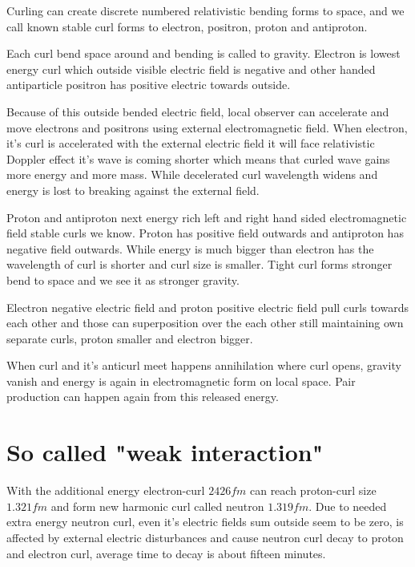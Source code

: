 Curling can create discrete numbered relativistic bending forms to space, and
we call known stable curl forms to electron, positron, proton and antiproton.

Each curl bend space around and bending is called to gravity. Electron is
lowest energy curl which outside visible electric field is negative and other
handed antiparticle positron has positive electric towards outside.

Because of this outside bended electric field, local observer can accelerate
and move electrons and positrons using external electromagnetic field. When
electron, it's curl is accelerated with the external electric field it will
face relativistic Doppler effect it's wave is coming shorter which means that
curled wave gains more energy and more mass. While decelerated curl wavelength
widens and energy is lost to breaking against the external field.

Proton and antiproton next energy rich left and right hand sided electromagnetic
field stable curls we know. Proton has positive field outwards and antiproton
has negative field outwards. While energy is much bigger than electron has the
wavelength of curl is shorter and curl size is smaller. Tight curl forms
stronger bend to space and we see it as stronger gravity.

Electron negative electric field and proton positive electric field pull curls
towards each other and those can superposition over the each other still
maintaining own separate curls, proton smaller and electron bigger.

When curl and it's anticurl meet happens annihilation\cite{Annihilation} where
curl opens, gravity vanish and energy is again in electromagnetic form on local
space. Pair production\cite{PairProduction} can happen again from this released
energy.

\section{So called "weak interaction"}
\label{weak_interaction}

With the additional energy electron-curl $2426fm$\cite{ComptonWavelength}
can reach proton-curl size $1.321fm$ and form new harmonic curl called neutron
$1.319fm$. Due to needed extra energy neutron curl, even it's electric fields
sum outside seem to be zero, is affected by external electric disturbances and
cause neutron curl decay to proton and electron curl, average time to decay is
about fifteen minutes.

